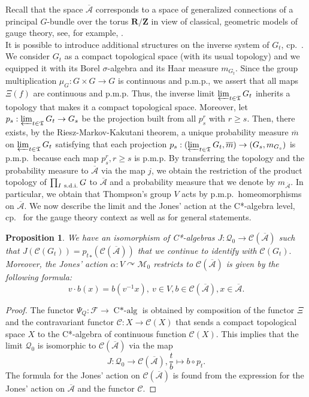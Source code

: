 \documentclass[a4paper,12pt]{amsart}
\numberwithin{equation}{section}
\newtheorem{proposition}[theo]{Proposition}
\theoremstyle{definition}
\newcommand{\act}{\curvearrowright}
\newcommand{\al}{\alpha}
\newcommand{\oscrA}{{\overline{\mathscr{A}}}}
\DeclareMathOperator{\Calg}{C*-alg}
\newcommand{\scrC}{\mathscr C}
\newcommand{\cF}{\mathcal F}
\newcommand{\scrM}{\mathscr M}
\newcommand{\scrQ}{\mathscr Q}
\newcommand{\R}{\mathbf{R}}
\newcommand{\fT}{\mathfrak T}
\newcommand{\Z}{\mathbf{Z}}
\begin{document}
Recall that the space $\oscrA$ corresponds to a space of generalized connections of a principal $G$-bundle over the torus $\R/\Z$ in view of classical, geometric models of gauge theory, see, for example, \cite{Velhinho-05-Functorial-Aspects, Thiemann-07-QuantumGR}.\\[0.25cm]
It is possible to introduce additional structures on the inverse system of $G_t$, cp.~\cite{Ashtekar-Lewandowski-94-Representation-Theory, Ashtekar-Lewandowski-95-Projective, Ashtekar-Lewandowski-95-Projective-Differential}.
We consider $G_t$ as a compact topological space (with its usual topology) and we equipped it with its Borel $\sigma$-algebra and its Haar measure $m_{G_t}$.
Since the group multiplication $\mu_G:G\times G\to G$ is continuous and p.m.p., we assert that all maps $\Xi(f)$ are continuous and p.m.p.
Thus, the inverse limit $\varprojlim_{t\in\fT} G_t$ inherits a topology that makes it a compact topological space.
Moreover, let $p_s:\varprojlim_{t\in\fT} G_t\to G_s$ be the projection built from all $p_s^{r}$ with $r \geq s$.
Then, there exists, by the Riesz-Markov-Kakutani theorem, a unique probability measure $\overline m$ on $\varprojlim_{t\in\fT} G_t$ satisfying that each projection $p_s:(\varprojlim_{t\in\fT} G_t , \overline m) \to (G_s,m_{G_s})$ is p.m.p.~because each map $p_s^r, r\geq s$ is p.m.p.
By transferring the topology and the probability measure to $\oscrA$ via the map $j$, we obtain the restriction of the product topology of $\prod_{I\ \textup{s.d.i.}} G$ to $\oscrA$ and a probability measure that we denote by $m_\oscrA$.
In particular, we obtain that Thompson's group $V$ acts by p.m.p.~homeomorphisms on $\oscrA$. 
We now describe the limit and the Jones' action at the C*-algebra level, cp.~\cite{Ashtekar-Lewandowski-95-Projective-Differential} for the gauge theory context as well as \cite{Blackadar-06-Operator-Algebras} for general statements.

\begin{proposition}\label{prop:VQaction}
We have an isomorphism of C*-algebras $J:\scrQ_0\to \scrC(\oscrA)$ such that $J(\scrC(G_t)) = {p_t}_*(\scrC(\oscrA))$ that we continue to identify with $\scrC(G_t).$
Moreover, the Jones' action $\al:V \act \scrM_0$ restricts to $\scrC(\oscrA)$ is given by the following formula:
$$v\cdot b(x) = b(v^{-1} x),\ v\in V, b\in\scrC(\oscrA), x\in\oscrA.$$
\end{proposition}

\begin{proof}
The functor $\Psi_Q:\cF\to \Calg$ is obtained by composition of the functor $\Xi$ and the contravariant functor $\scrC:X\to \scrC(X)$ that sends a compact topological space $X$ to the C*-algebra of continuous function $\scrC(X)$.
This implies that the limit $\scrQ_0$ is isomorphic to $\scrC(\oscrA)$ via the map 
$$J:\scrQ_0\to \scrC(\oscrA), \dfrac{t}{b}\mapsto b\circ p_t.$$
The formula for the Jones' action on $\scrC(\oscrA)$ is found from the expression for the Jones' action on $\oscrA$ and the functor $\scrC$.
\end{proof}
\end{document}
